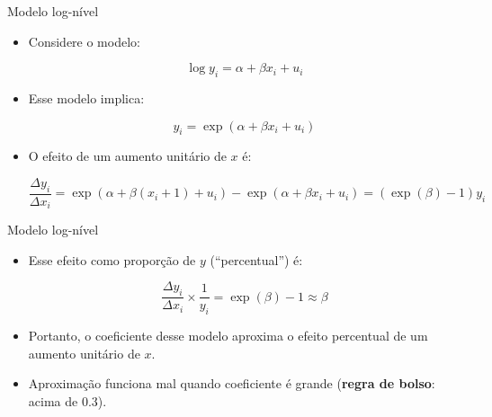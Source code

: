 \documentclass[10pt,slides,xcolor=pdftex,dvipsnames,table]{beamer}
\begin{document}

\begin{frame}{Modelo log-nível}

\begin{itemize}\itemsep1.2em

    \item Considere o modelo:
    
    $$ \log y_i = \alpha + \beta x_i + u_i $$
    
    \item Esse modelo implica:
    
    $$ y_i = \exp (\alpha + \beta x_i + u_i) $$
    
	\item O efeito de um aumento unitário de $x$ é:
	
	$$ \frac{\Delta y_i}{\Delta x_i} = \exp (\alpha + \beta (x_i + 1) + u_i) - \exp (\alpha + \beta x_i + u_i) = (\exp(\beta)-1) y_i $$      
    
    \end{itemize}

\end{frame}


\begin{frame}{Modelo log-nível}

\begin{itemize}\itemsep1.2em
	
	\item Esse efeito como proporção de $y$ (``percentual'') é:
	
	$$ \frac{\Delta y_i}{\Delta x_i} \times \frac{1}{y_i} =  \exp(\beta)-1 \approx \beta $$   
    
    \item Portanto, o coeficiente desse modelo aproxima o efeito percentual de um aumento unitário de $x$. 
    
    \item Aproximação funciona mal quando coeficiente é grande (\textbf{regra de bolso}: acima de 0.3).       
    
    \end{itemize}

\end{frame}

\end{document}
